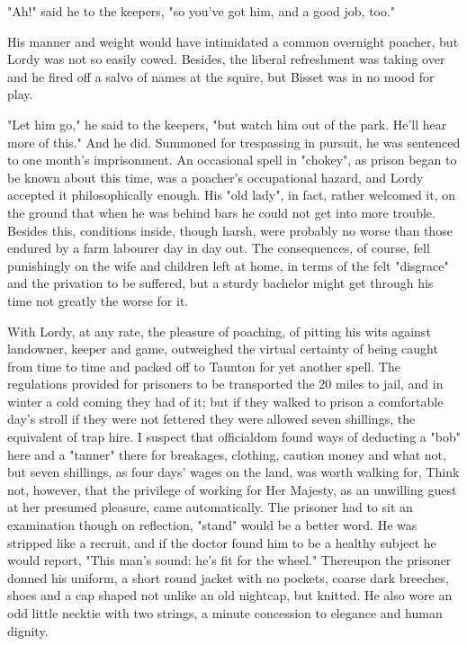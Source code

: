 "Ah!" said he to the keepers, "so you've got him, and a good job, too."

His manner and weight would have intimidated a common overnight poacher, but Lordy was not so easily cowed. Besides, the liberal refreshment was taking over and he fired off a salvo of names at the squire, but Bisset was in no mood for play.

"Let him go," he said to the keepers, "but watch him out of the park. He'll hear more of this."
And he did. Summoned for trespassing in pursuit, he was sentenced to one month's imprisonment.
An occasional spell in "chokey", as prison began to be known about this time, was a poacher's occupational hazard, and Lordy accepted it philosophically enough. His "old lady", in fact, rather welcomed it, on the ground that when he was behind bars he could not get into more trouble. Besides this, conditions inside, though harsh, were probably no worse than those endured by a farm labourer day in day out.
 The consequences, of course, fell punishingly on the wife and children left at home, in terms of the felt "disgrace" and the privation to be suffered, but a sturdy bachelor might get through his time not greatly the worse for it.
 
With Lordy, at any rate, the pleasure of poaching, of pitting his wits against landowner, keeper and game, outweighed the virtual certainty of being caught from time to time and packed off to Taunton for yet another spell.
 The regulations provided for prisoners to be transported the 20 miles to jail, and in winter a cold coming they had of it; but if they walked to prison   a comfortable day's stroll if they were not fettered   they were allowed seven shillings, the equivalent of trap hire. I suspect that officialdom found ways of deducting a "bob" here and a "tanner" there for breakages, clothing, caution money and what not, but seven shillings, as four days' wages on the land, was worth walking for,
 Think not, however, that the privilege of working for Her Majesty, as an unwilling guest at her presumed pleasure, came automatically. The prisoner had to sit an examination   though on reflection, "stand" would be a better word. He was stripped like a recruit, and if the doctor found him to be a healthy subject he would report, "This man's sound: he's fit for the wheel." Thereupon the prisoner donned his uniform, a short round jacket with no pockets, coarse dark breeches, shoes and a cap shaped not unlike an old nightcap, but knitted. He also wore an odd little necktie with two strings, a minute concession to elegance and human dignity.
 
